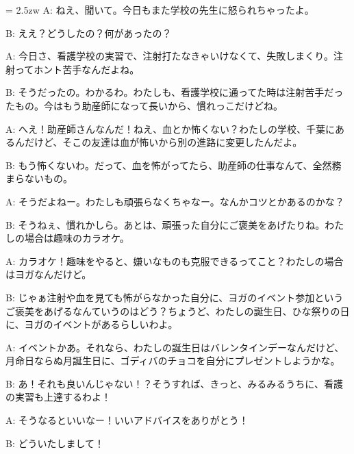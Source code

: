 \documentclass[11pt]{amsart}
\title{}
\author{}
\newenvironment{hangall}[1]{\hangindent = 2.5zw\everypar{\hangindent = 2.5zw}}{}
\begin{document}
\maketitle
\begin{hangall}{}%
A: ねえ、聞いて。今日もまた学校の先生に怒られちゃったよ。

B: ええ？どうしたの？何があったの？

A: 今日さ、看護学校の実習で、注射打たなきゃいけなくて、失敗しまくり。注射ってホント苦手なんだよね。

B: そうだったの。わかるわ。わたしも、看護学校に通ってた時は注射苦手だったもの。今はもう助産師になって長いから、慣れっこだけどね。

A: へえ！助産師さんなんだ！ねえ、血とか怖くない？わたしの学校、千葉にあるんだけど、そこの友達は血が怖いから別の進路に変更したんだよ。

B: もう怖くないわ。だって、血を怖がってたら、助産師の仕事なんて、全然務まらないもの。

A: そうだよねー。わたしも頑張らなくちゃなー。なんかコツとかあるのかな？

B: そうねぇ、慣れかしら。あとは、頑張った自分にご褒美をあげたりね。わたしの場合は趣味のカラオケ。

A: カラオケ！趣味をやると、嫌いなものも克服できるってこと？わたしの場合はヨガなんだけど。

B: じゃぁ注射や血を見ても怖がらなかった自分に、ヨガのイベント参加というご褒美をあげるなんていうのはどう？ちょうど、わたしの誕生日、ひな祭りの日に、ヨガのイベントがあるらしいわよ。

A: イベントかあ。それなら、わたしの誕生日はバレンタインデーなんだけど、月命日ならぬ月誕生日に、ゴディバのチョコを自分にプレゼントしようかな。

B: あ！それも良いんじゃない！？そうすれば、きっと、みるみるうちに、看護の実習も上達するわよ！

A: そうなるといいなー！いいアドバイスをありがとう！

B: どういたしまして！
\end{hangall}
\end{document}
